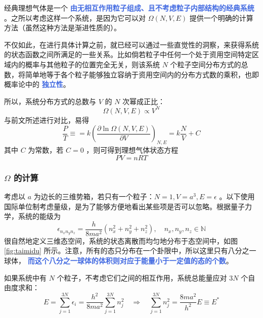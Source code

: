 \documentclass[hyperref,UTF-8]{ctexart}
\newcommand{\0}{\boldsymbol{0}}
\begin{document}
经典理想气体是一个 \textcolor{RoyalBlue}{\textbf{\kaishu 由无相互作用粒子组成、且不考虑粒子内部结构的经典系统}} 。之所以考虑这样一个系统，是因为它可以对 $\Omega(N,V,E)$ 提供一个明确的计算方法（虽然这种方法是渐进性质的）。 

不仅如此，在进行具体计算之前，就已经可以通过一些直觉性的洞察，来获得系统的状态函数之间所满足的一些关系。比如倘若粒子中任何一个处于资用空间特定区域内的概率与其他粒子的位置完全无关，则该系统  $N$ 个粒子空间分布方式的总数，将简单地等于各个粒子能够独立容纳于资用空间内的分布方式数的乘积，也即概率论中的 \textcolor{RoyalBlue}{\textbf{\kaishu 独立性}}。

所以，系统分布方式的总数与 $V$ 的 $N$ 次幂成正比：
\begin{equation}
    \Omega(N,V,E) \propto V^N
\end{equation}
与前文所述进行对比，易得
\begin{equation}
    \frac{P}{T} \equiv = k \left(\frac{\partial \ln\Omega(N,V,E)}{\partial V}\right)_{N,E} = k\frac{N}{V} + C
\end{equation}
其中 $C$ 为常数，若 $C= 0$ ，则可得到理想气体状态方程
\begin{equation}
    PV = nRT
\end{equation}

\subsubsection{$\Omega$ 的计算}

考虑以 $a$ 为边长的三维势箱，若只有一个粒子：$N =1,V = a^3, E = \epsilon$ 。以下使用国际单位制考虑量级，是为了能够方便地看出某些项是否可以忽略。根据量子力学，系统的能级为
\begin{equation}
    \epsilon_{n_xn_yn_z} = \frac{h}{8ma^2} (n_x^2 + n_y^2 + n_z^2), \quad n_x, n_y, n_z\in \mathbb{N}
\end{equation}
很自然地定义三维态空间，系统的状态离散而均匀地分布于态空间中，如图 \ref{fig:taimidu} 所示。注意，所有的态只分布在一个卦限中，所以这里只有八分之一球体， \textcolor{RoyalBlue}{\textbf{\kaishu  而这个八分之一球体的体积则对应于能量小于一定值的态的个数}}。

如果系统中有 $N$ 个粒子，不考虑它们之间的相互作用，系统总能量应对 $3N$ 个自由度求和：
\begin{equation}\label{equ:qiu}
    E = \sum_{j=1}^{3 N} \epsilon_i=\frac{ h^2}{8 m a^2} \sum_{j=1}^{3 N} n_j^2 \quad \Longrightarrow  \quad \sum_{j=1}^{3 N} n_j^2 = \frac{8ma^2}{h^2} E\equiv E^*
\end{equation}
\end{document}
